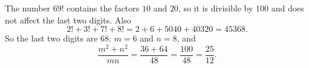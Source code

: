 The number $69!$ contains the factors $10$ and $20$, so it is divisible by $100$ and does not affect the last two digits. Also
\[2!+3!+7!+8!=2+6+5040+40320=45368.\]
So the last two digits are $68$: $m=6$ and $n=8$, and
\[\dfrac{m^2+n^2}{mn}=\dfrac{36+64}{48}=\dfrac{100}{48}=\boxed{\dfrac{25}{12}}.\]
